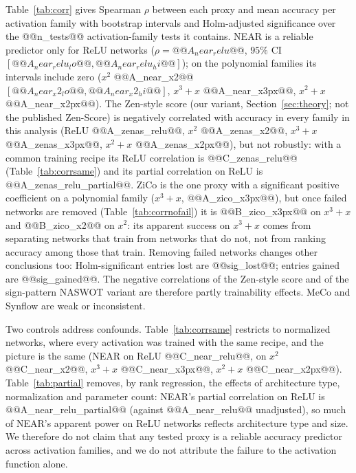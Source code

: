 Table~\ref{tab:corr} gives Spearman $\rho$ between each proxy and mean accuracy per activation family with bootstrap intervals and Holm-adjusted
significance over the @@n_tests@@ activation-family tests it contains.  NEAR is a reliable predictor only for ReLU networks
($\rho=@@A_near_relu@@$, $95\%$ CI $[@@A_near_relu_lo@@,@@A_near_relu_hi@@]$); on the polynomial families its intervals include zero
($x^2$ @@A_near_x2@@ $[@@A_near_x2_lo@@,@@A_near_x2_hi@@]$, $x^3{+}x$ @@A_near_x3px@@, $x^2{+}x$ @@A_near_x2px@@).  The Zen-style score (our variant, Section~\ref{sec:theory}; not the published Zen-Score) is negatively correlated with accuracy in every family in this analysis
(ReLU @@A_zenas_relu@@, $x^2$ @@A_zenas_x2@@, $x^3{+}x$ @@A_zenas_x3px@@, $x^2{+}x$ @@A_zenas_x2px@@), but not robustly: with a common training recipe its ReLU correlation is @@C_zenas_relu@@ (Table~\ref{tab:corrsame}) and its partial correlation on ReLU is @@A_zenas_relu_partial@@.  ZiCo is the one proxy with a significant positive coefficient on a polynomial family
($x^3{+}x$, @@A_zico_x3px@@), but once failed networks are removed (Table~\ref{tab:corrnofail}) it is @@B_zico_x3px@@ on $x^3{+}x$ and @@B_zico_x2@@ on $x^2$:
its apparent success on $x^3{+}x$ comes from separating networks that train from networks that do not, not from ranking accuracy among those that train.
Removing failed networks changes other conclusions too: Holm-significant entries lost are @@sig_lost@@; entries gained are @@sig_gained@@.  The negative correlations of the Zen-style score and of the sign-pattern NASWOT variant are therefore partly trainability effects.
MeCo and Synflow are weak or inconsistent.

Two controls address confounds.  Table~\ref{tab:corrsame} restricts to normalized networks, where every activation was trained with the same recipe, and the picture is the same
(NEAR on ReLU @@C_near_relu@@, on $x^2$ @@C_near_x2@@, $x^3{+}x$ @@C_near_x3px@@, $x^2{+}x$ @@C_near_x2px@@).  Table~\ref{tab:partial} removes, by rank regression, the effects of architecture type, normalization and
parameter count: NEAR's partial correlation on ReLU is @@A_near_relu_partial@@ (against @@A_near_relu@@ unadjusted), so much of NEAR's apparent power on ReLU networks reflects architecture type and
size.  We therefore do not claim that any tested proxy is a reliable accuracy predictor across activation families, and we do not attribute the failure to the activation function alone.






